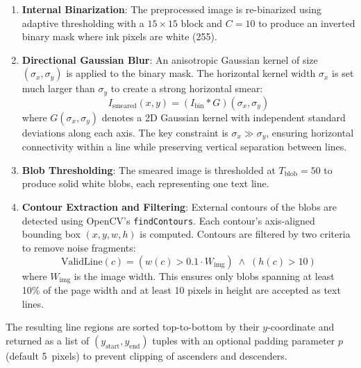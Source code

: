 \documentclass[12pt, a4paper]{article}
\begin{document}
\begin{enumerate}
    \item \textbf{Internal Binarization}: The preprocessed image is re-binarized using adaptive thresholding with a $15 \times 15$ block and $C = 10$ to produce an inverted binary mask where ink pixels are white (255).

    \item \textbf{Directional Gaussian Blur}: An anisotropic Gaussian kernel of size $(\sigma_x, \sigma_y)$ is applied to the binary mask. The horizontal kernel width $\sigma_x$ is set much larger than $\sigma_y$ to create a strong horizontal smear:
    \begin{equation}
        I_{\text{smeared}}(x,y) = (I_{\text{bin}} * G)(\sigma_x, \sigma_y)
        \label{eq:aniso_blur}
    \end{equation}
    where $G(\sigma_x, \sigma_y)$ denotes a 2D Gaussian kernel with independent standard deviations along each axis. The key constraint is $\sigma_x \gg \sigma_y$, ensuring horizontal connectivity within a line while preserving vertical separation between lines.

    \item \textbf{Blob Thresholding}: The smeared image is thresholded at $T_{\text{blob}} = 50$ to produce solid white blobs, each representing one text line.

    \item \textbf{Contour Extraction and Filtering}: External contours of the blobs are detected using OpenCV's \texttt{findContours}. Each contour's axis-aligned bounding box $(x, y, w, h)$ is computed. Contours are filtered by two criteria to remove noise fragments:
    \begin{equation}
        \text{ValidLine}(c) = \left( w(c) > 0.1 \cdot W_{\text{img}} \right) \;\wedge\; \left( h(c) > 10 \right)
        \label{eq:contour_filter}
    \end{equation}
    where $W_{\text{img}}$ is the image width. This ensures only blobs spanning at least 10\% of the page width and at least 10 pixels in height are accepted as text lines.
\end{enumerate}

The resulting line regions are sorted top-to-bottom by their $y$-coordinate and returned as a list of $(y_{\text{start}}, y_{\text{end}})$ tuples with an optional padding parameter $p$ (default 5~pixels) to prevent clipping of ascenders and descenders.
\end{document}
